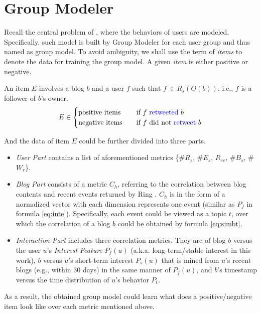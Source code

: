\section{Group Modeler}
\label{sec:gm}


Recall the central problem of \sys{}, where the \retg{} behaviors of users are modeled.
Specifically, such model is built by Group Modeler for each user group and thus named as group model.
To avoid ambiguity, we shall use the term of \textit{items} to denote the data for training the group model.
A given \textit{item} is either positive or negative.

\begin{definition}
\label{def:gm-it}
An item $E$ involves a blog $b$ and a user $f$ such that $f\ \in R_s(O(b))$, i.e., $f$ is a follower of $b$'s owner.
\begin{equation}
\label{eq:gm-it}
E \in
  \begin{cases}
    \text{positive items}       & \quad \text{if } f \text{ \textcolor{blue}{retweeted}{} } b\\
    \text{negative items}  		& \quad \text{if } f \text{ did not \textcolor{blue}{retweet}{} } b
  \end{cases}
\end{equation}
\end{definition}

And the data of item $E$ could be further divided into three parts.
\begin{itemize}
	\item \textit{User Part} contains a list of aforementioned metrics \{\#$R_s$, \#$E_s$, $R_{ee}$, \#$B_s$, \#$W_r$\}.
	\item \textit{Blog Part} consists of a metric $C_h$, referring to the correlation between blog contents and recent events returned by Ring . $C_h$ is in the form of a normalized vector with each dimension represents one event (similar as $P_f$ in formula \ref{eq:inte}). Specifically, each event could be viewed as a topic $t$, over which the correlation of a blog $b$ could be obtained by formula \ref{eq:simbt}.
	\item \textit{Interaction Part} includes three correlation metrics. They are of blog $b$ versus the user $u$'s \textit{Interest Feature} $P_f(u)$ (a.k.a. long-term/stable interest in this work), $b$ versus $u$'s short-term interest $P_s(u)$ that is mined from $u$'s recent blogs (e.g., within 30 days) in the same manner of $P_f(u)$, and $b$'s timestamp versus the time distribution of $u$'s \retg{} behavior $P_t$. 
\end{itemize}
As a result, the obtained group model could learn what does a positive/negative item look like over each metric mentioned above.










